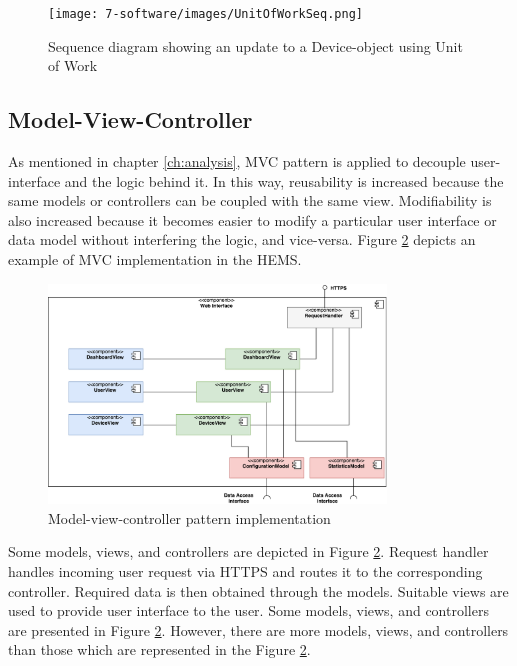 \begin{figure}[H]
\centering
\texttt{[image: 7-software/images/UnitOfWorkSeq.png]}
\caption{Sequence diagram showing an update to a Device-object using Unit of Work}
\label{fig:unitofworkseq}
\end{figure}



\clearpage
\subsection{Model-View-Controller}
\label{sec:mvc}
As mentioned in chapter \ref{ch:analysis}, MVC pattern is applied to decouple user-interface and the logic behind it. In this way, reusability is increased because the same models or controllers can be coupled with the same view. Modifiability is also increased because it becomes easier to modify a particular user interface or data model without interfering the logic, and vice-versa. Figure \ref{fig:mvc-architecture} depicts an example of MVC implementation in the HEMS.

\begin{figure}[H]
	\centering
	\includegraphics[width=0.8\textwidth]{7-software/images/mvc.pdf}
	\caption{Model-view-controller pattern implementation}
	\label{fig:mvc-architecture}
\end{figure}

Some models, views, and controllers are depicted in Figure \ref{fig:mvc-architecture}. Request handler handles incoming user request via HTTPS and routes it to the corresponding controller. Required data is then obtained through the models. Suitable views are used to provide user interface to the user. Some models, views, and controllers are presented in Figure \ref{fig:mvc-architecture}. However, there are more models, views, and controllers than those which are represented in the Figure \ref{fig:mvc-architecture}.

